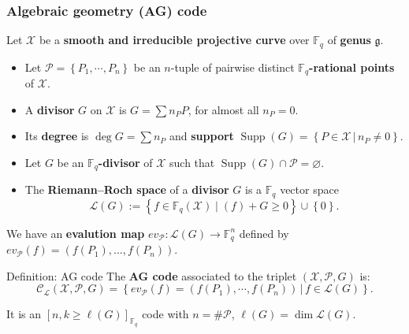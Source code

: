 \documentclass[
10pt, %
%
aspectratio=169, %
]{beamer}
\theoremstyle{plain}%
\theoremstyle{definition}
\theoremstyle{remark}
\newcommand{\calP}{\mathcal{P}}
\newcommand{\calL}{\mathcal{L}}
\newcommand{\calC}{\mathcal{C}}
\newcommand{\calX}{\mathcal{X}}
\newcommand{\fqm}{\mathbb{F}_{q^m}}
\newcommand{\fq}{\mathbb{F}_{q}}
\newcommand{\set}[1]{\left\{#1\right\}}
\newcommand{\Supp}{\operatorname{Supp}}
\begin{document}
\begin{frame}
	\frametitle{Algebraic geometry (AG) code}
	Let $\calX$ be a \textbf{smooth and irreducible projective curve} over $\fq$ of \textbf{genus} $\mathfrak{g}$.
	
	\begin{itemize}
		\item Let $\calP = \left\lbrace P_1,\cdots,P_n \right\rbrace$ be an $n$-tuple of pairwise distinct $\fq$\textbf{-rational points} of $\calX$.
		\item A \textbf{divisor} $G$ on $\calX$ is $G=\sum n_P P$, for almost all $n_P=0$.
		\item Its \textbf{degree} is $\deg G = \sum n_P$ and \textbf{support} $\Supp(G)=\left\lbrace P \in \calX \, |\, n_P\neq 0\right\rbrace $.
		\item Let $G$ be an $\fq$\textbf{-divisor} of $\calX$ such that $\Supp(G) \cap \calP= \varnothing$.
		\item The \textbf{Riemann--Roch space} of a \textbf{divisor} $G$ is a $\fq$ vector space
		$$ \calL(G) := \set{f \in \fq(\calX) \mid (f) + G \geq 0} \cup \set{0}.$$
	\end{itemize}
\begin{tcolorbox}[colback=lightkhaki]
	We have an \textbf{evalution map} $ev_{\calP} \colon \calL(G)	\rightarrow   \fq^n $ defined by $ev_{\calP}(f)=\left( f(P_1),\dots,f(P_n) \right)$.
\end{tcolorbox}
\begin{block}{Definition: AG code}
	The \textbf{AG code} associated to the triplet $(\calX, \calP, G)$ is:
	\vspace{-0.8em}
	\[ \calC_{\calL}(\calX,\calP,G)= \left\lbrace ev_{\calP}(f)=(f(P_1),\cdots,f(P_n))\,|\, f \in \calL(G)\right\rbrace. \] 
\end{block}
\vspace{-0.8em}
It is an $[n, k \geq \ell(G)]_{\fq}$ code with $n=\#\calP$, $\ell(G) = \dim\calL(G)$.
\end{frame}
\end{document}
